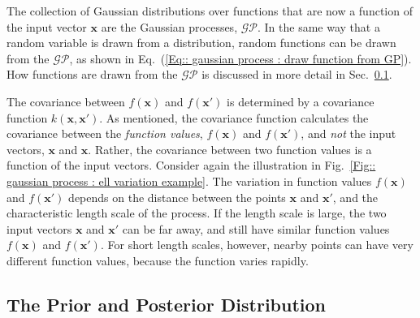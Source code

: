 \documentclass[twoside,english]{uiofysmaster}
\begin{document}
{{The collection of Gaussian distributions over functions that are now a function of the input vector $\textbf{x}$ are the Gaussian processes, $\mathcal{GP}$. In the same way that a random variable is drawn from a distribution, random functions can be drawn from the $\mathcal{GP}$, as shown in Eq.~(\ref{Eq:: gaussian process : draw function from GP}). How functions are drawn from the $\mathcal{GP}$ is discussed in more detail in Sec.~\ref{Sec:: gaussian process : the prior and posterior distribution}.

The covariance between $f(\textbf{x})$ and $f(\textbf{x}')$ is determined by a covariance function $k(\textbf{x}, \textbf{x}')$. As mentioned, the covariance function calculates the covariance between the \textit{function values}, $f(\textbf{x})$ and $f(\textbf{x}')$, and \textit{not} the input vectors, $\textbf{x}$ and $\textbf{x}$. Rather, the covariance between two function values is a function of the input vectors. Consider again the illustration in Fig.~\ref{Fig:: gaussian process : ell variation example}. The variation in function values $f(\textbf{x})$ and $f(\textbf{x}')$ depends on the distance between the points $\textbf{x}$ and $\textbf{x}'$, and the characteristic length scale of the process. If the length scale is large, the two input vectors $\textbf{x}$ and $\textbf{x}'$ can be far away, and still have similar function values $f(\textbf{x})$ and $f(\textbf{x}')$. For short length scales, however, nearby points can have very different function values, because the function varies rapidly.

\subsection{The Prior and Posterior Distribution}\label{Sec:: gaussian process : the prior and posterior distribution}



}}
\end{document}
